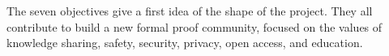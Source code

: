The seven objectives give a first idea of the shape of the project.
They all contribute to build a new formal proof community, focused
on the values of knowledge sharing, safety, security, privacy, open
access, and education.

